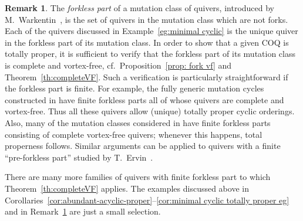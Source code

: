 \documentclass[11pt, letterpaper]{amsart}
\newcommand{\cS}[1]{{\noindent\textsf{\color{purple}$\blacksquare$~#1~$\blacksquare$}}}
\theoremstyle{definition}
\newtheorem{remark}[theorem]{Remark}
\numberwithin{equation}{section}
\begin{document}
\begin{remark} %
\label{rem:forkless-part eg}
The \emph{forkless part} of a mutation class of quivers, 
introduced by M.~Warkentin~\cite{Warkentin},  is the set of quivers in the mutation class which are not forks. %
Each of the quivers discussed in Example~\ref{eg:minimal cyclic} is the unique quiver in the forkless part 
of its mutation class. 
In order to show that a given COQ is totally proper, 
it is sufficient to verify that the forkless part of its mutation class is complete and vortex-free, 
cf.\ Proposition~\ref{prop: fork vf} and Theorem~\ref{th:completeVF}.
Such a verification is particularly straightforward if the forkless part is finite.
For example, the fully generic mutation cycles constructed in \cite[Examples 10.1--10.2]{LMC} 
have finite forkless parts all of whose quivers are complete and vortex-free.
Thus all these quivers allow (unique) totally proper cyclic orderings.
Also, many of the mutation classes considered in \cite{MR2805200}
have finite forkless parts consisting of complete vortex-free quivers;
whenever this happens, total properness follows. 
Similar arguments can be applied to quivers with a finite ``pre-forkless part'' studied by T.~Ervin~\cite{Ervin}. 
\end{remark}



There are many more families of quivers with finite forkless part to which Theorem~\ref{th:completeVF} applies. 
The examples discussed above in Corollaries~\ref{cor:abundant-acyclic-proper}--\ref{cor:minimal cyclic totally proper eg}
and in Remark~\ref{rem:forkless-part eg} are just a small selection. 

\end{document}
